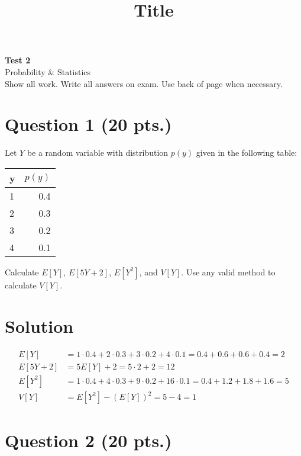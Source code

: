 \documentclass[11pt]{article}
\theoremstyle{definition}
\begin{document}
\title{Title}

\thispagestyle{empty}

\begin{center}
{\LARGE \bf Test 2} \\
{\large Probability \& Statistics} \\
{\large Show all work. Write all answers on exam. Use back of page when necessary. } \\
\end{center}
\section*{Question 1 (20 pts.)}

Let $Y$ be a random variable with distribution $p(y)$ given in the following table:

\begin{table}[h]
	\centering
	\begin{tabular}{lr}
		\hline
		y & $p(y)$ \\
		\hline
		1 & 0.4 \\
		2 & 0.3 \\
		3 & 0.2 \\
		4 & 0.1 \\
		\hline
	\end{tabular}
\end{table}

\noindent Calculate $E[Y]$, $E[5Y+2]$, $E\left[ Y^2 \right]$, and $V[Y]$. Use any valid method to calculate $V[Y]$.

\section*{Solution}

$$
\begin{aligned}
	E[Y] & = 1 \cdot 0.4 + 2 \cdot 0.3 + 3 \cdot 0.2 + 4 \cdot 0.1 = 0.4 + 0.6 + 0.6 + 0.4 = 2 \\
	E[5Y+2] & = 5E[Y]+2 = 5\cdot2 +2 = 12 \\
	E\left[ Y^2 \right] & = 1 \cdot 0.4 + 4 \cdot 0.3 + 9 \cdot 0.2 + 16 \cdot 0.1 = 0.4 + 1.2 + 1.8 + 1.6 = 5 \\
	V[Y] & = E\left[ Y^2 \right] - \left( E[Y] \right)^2 = 5 - 4 = 1
\end{aligned}
$$

\newpage

\section*{Question 2 (20 pts.)}
\end{document}
